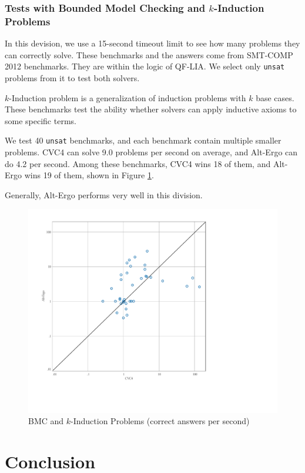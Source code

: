 \documentclass[10pt,letter]{article}
\theoremstyle{definition}
\begin{document}
\subsubsection{Tests with Bounded Model Checking and $k$-Induction Problems}

In this devision, we use a 15-second timeout limit to see how many problems they can correctly solve. These benchmarks and the answers come from SMT-COMP 2012 benchmarks. They are within the logic of QF-LIA. We select only {\tt unsat} problems from it to test both solvers.

$k$-Induction problem is a generalization of induction problems with $k$ base cases. These benchmarks test the ability whether solvers can apply inductive axioms to some specific terms.

We test 40 {\tt unsat} benchmarks, and each benchmark contain multiple smaller problems. CVC4 can solve 9.0 problems per second on average, and Alt-Ergo can do 4.2 per second. Among these benchmarks, CVC4 wins 18 of them, and Alt-Ergo wins 19 of them, shown in Figure \ref{f:ind}.

Generally, Alt-Ergo performs very well in this division.


\begin{figure}
\centering
\includegraphics[scale=0.5]{./testanalysis/ScatterInduction.pdf}
\caption{BMC and $k$-Induction Problems (correct answers per second)}
\label{f:ind}
\end{figure}



\section{Conclusion}
\end{document}
